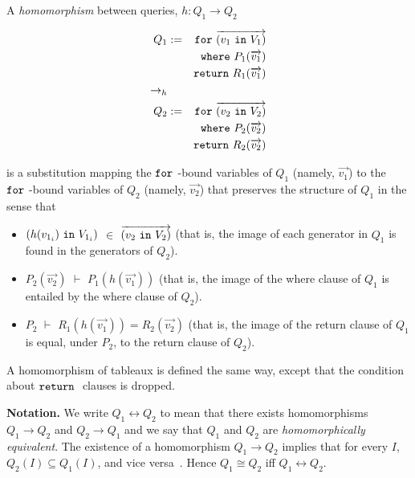 \documentclass[preprint]{sigplanconf}
\newcommand{\FOR}{{\tt for} \ }
\newcommand{\WHERE}{{\tt where} \ }
\newcommand{\IN}{ \ {\tt in} \ }
\newcommand{\RETURN}{{\tt return} \ }
\begin{document}
A {\it homomorphism} between queries, $h : Q_1 \to Q_2$ 
\begin{normalsize}
\begin{eqnarray*}
Q_1 & := & \FOR \overrightarrow{(v_1 \IN V_1)} \\
          & & \WHERE P_1(\overrightarrow{v_1}) \\
          & & \RETURN R_1(\overrightarrow{v_1}) \\
\to_h & & \\        
Q_2 & := & \FOR \overrightarrow{(v_2 \IN V_2)} \\
          & & \WHERE P_2(\overrightarrow{v_2}) \\
          & & \RETURN R_2(\overrightarrow{v_2})
\end{eqnarray*}
\end{normalsize}
is a substitution mapping the $\FOR$-bound variables of $Q_1$ (namely, $
\overrightarrow{v_1}$) to the $\FOR$-bound variables of $Q_2$ (namely, $
\overrightarrow{v_2}$) that preserves the structure of $Q_1$ in the sense that
\begin{itemize}
\item  
 $(h(v_{1_i}) \IN V_{1_i})$ $ \in$ $\overrightarrow{(v_2 \IN V_2)}$ (that is, the image of each generator in $Q_1$ is found in the generators of $Q_2$). 

\item $P_2(\overrightarrow{v_2})$ $\vdash$ $P_1(h(\overrightarrow{v_1}))$  (that is, the image of the where clause of $Q_1$ is entailed by the where clause of $Q_2$).

\item $P_2$ $\vdash$ $R_1(h(\overrightarrow{v_1})) = R_2(\overrightarrow{v_2})$ (that is, the image of the return clause of $Q_1$ is equal, under $P_2$, to the return clause of $Q_2$).
\end{itemize}
A homomorphism of tableaux is defined the same way, except that the condition about $\RETURN$ clauses is dropped.  

{\bf Notation.} We write $Q_1 \leftrightarrow Q_2$ to mean that there exists homomorphisms $Q_1 \to Q_2$ and $Q_2 \to Q_1$ and we say that $Q_1$ and $Q_2$ are {\it homomorphically equivalent}.  The existence of a homomorphism $Q_1 \to Q_2$ implies that for every $I$, $Q_2(I) \subseteq Q_1(I)$, and vice versa~\cite{foundations}.  Hence $Q_1 \cong Q_2$ iff $Q_1 \leftrightarrow Q_2$.
\end{document}
